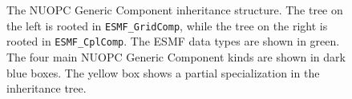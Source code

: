 \begin{figure}[h]
\begin{center}
\vspace{.5in}
\end{center}
\caption{The NUOPC Generic Component inheritance structure. The tree on the left is rooted in {\tt ESMF\_GridComp}, while the tree on the right is rooted in {\tt ESMF\_CplComp}. The ESMF data types are shown in green. The four main NUOPC Generic Component kinds are shown in dark blue boxes. The yellow box shows a partial specialization in the inheritance tree.}
\label{fig:NUOPCGenericComp}
\end{figure}



